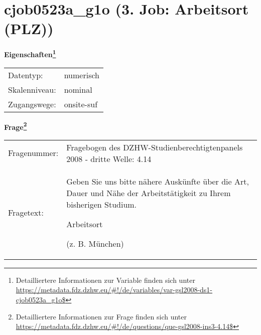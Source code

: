 
    \setcounter{footnote}{0}

    \vspace*{-1.8cm}
	\section{cjob0523a\_g1o (3. Job: Arbeitsort (PLZ))}
	\label{section:cjob0523a_g1o}



    \vspace*{0.5cm}
    \noindent\textbf{Eigenschaften\footnote{Detailliertere Informationen zur Variable finden sich unter
		\url{https://metadata.fdz.dzhw.eu/\#!/de/variables/var-gsl2008-ds1-cjob0523a_g1o$}}}\\
	\begin{tabularx}{\hsize}{@{}lX}
	Datentyp: & numerisch \\
	Skalenniveau: & nominal \\
	Zugangswege: &
	  onsite-suf
 \\
    \end{tabularx}



				\vspace*{0.5cm}
                \noindent\textbf{Frage\footnote{Detailliertere Informationen zur Frage finden sich unter
		              \url{https://metadata.fdz.dzhw.eu/\#!/de/questions/que-gsl2008-ins3-4.14$}}}\\
				\begin{tabularx}{\hsize}{@{}lX}
					Fragenummer: &
					  Fragebogen des DZHW-Studienberechtigtenpanels 2008 - dritte Welle:
					  4.14
 \\
					Fragetext: & Geben Sie uns bitte nähere Auskünfte über die Art, Dauer und Nähe der Arbeitstätigkeit zu Ihrem bisherigen Studium.\par  Arbeitsort\par  (z. B. München) \\
				\end{tabularx}





